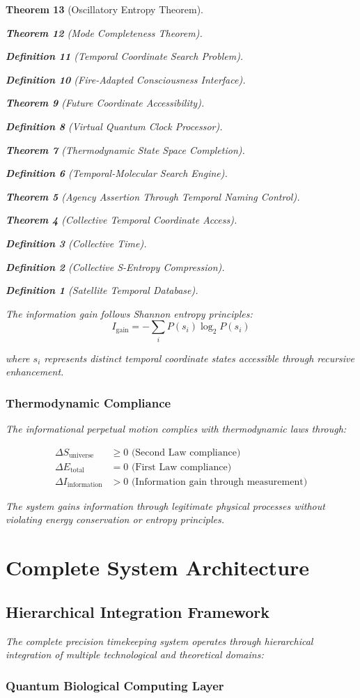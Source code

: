 \documentclass[12pt,a4paper]{article}
\newtheorem{theorem}{Theorem}[section]
\newtheorem{definition}[theorem]{Definition}
\begin{document}
\begin{theorem}[Oscillatory Entropy Theorem]
\begin{theorem}[Mode Completeness Theorem]
\begin{enumerate}
\begin{definition}[Temporal Coordinate Search Problem]
\begin{algorithm}
\begin{definition}[Fire-Adapted Consciousness Interface]
\begin{theorem}[Future Coordinate Accessibility]
\begin{definition}[Virtual Quantum Clock Processor]
\begin{itemize}
\begin{itemize}
\begin{theorem}[Thermodynamic State Space Completion]
\begin{definition}[Temporal-Molecular Search Engine]
\begin{theorem}[Agency Assertion Through Temporal Naming Control]
\begin{remark}
\begin{theorem}[Collective Temporal Coordinate Access]
\begin{definition}[Collective Time]
\begin{definition}[Collective S-Entropy Compression]
\begin{definition}[Satellite Temporal Database]
\begin{algorithm}
\begin{table}[h]
{The information gain follows Shannon entropy principles:
$$I_{\text{gain}} = -\sum_{i} P(s_i) \log_2 P(s_i)$$

where $s_i$ represents distinct temporal coordinate states accessible through recursive enhancement.

\subsubsection{Thermodynamic Compliance}

The informational perpetual motion complies with thermodynamic laws through:

\begin{align}
\Delta S_{\text{universe}} &\geq 0 \text{ (Second Law compliance)} \\
\Delta E_{\text{total}} &= 0 \text{ (First Law compliance)} \\
\Delta I_{\text{information}} &> 0 \text{ (Information gain through measurement)}
\end{align}

The system gains information through legitimate physical processes without violating energy conservation or entropy principles.

\section{Complete System Architecture}

\subsection{Hierarchical Integration Framework}

The complete precision timekeeping system operates through hierarchical integration of multiple technological and theoretical domains:

\subsubsection{Quantum Biological Computing Layer}

}
\end{table}
\end{algorithm}
\end{definition}
\end{definition}
\end{definition}
\end{theorem}
\end{remark}
\end{theorem}
\end{definition}
\end{theorem}
\end{itemize}
\end{itemize}
\end{definition}
\end{theorem}
\end{definition}
\end{algorithm}
\end{definition}
\end{enumerate}
\end{theorem}
\end{theorem}
\end{document}
